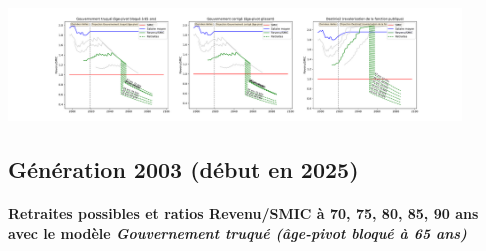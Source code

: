  \begin{center}\includegraphics[width=0.9\textwidth]{fig/SecretaireAdmin_1990_22_dest_retraite.pdf}\end{center} \label{fig/SecretaireAdmin_1990_22_dest_retraite.pdf} 

\newpage 
 
\subsection{Génération 2003 (début en 2025)} 

\paragraph{Retraites possibles et ratios Revenu/SMIC à 70, 75, 80, 85, 90 ans avec le modèle \emph{Gouvernement truqué (âge-pivot bloqué à 65 ans)}}  
 
